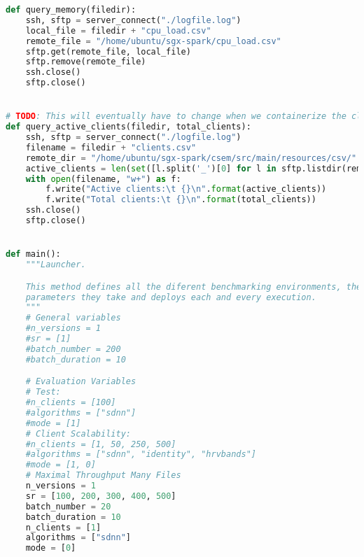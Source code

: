 \begin{lstlisting}[language=Python,caption={Benchmarking and Experiment Deployment Script.},label=code:deployment:experiments]
def query_memory(filedir):
    ssh, sftp = server_connect("./logfile.log")
    local_file = filedir + "cpu_load.csv"
    remote_file = "/home/ubuntu/sgx-spark/cpu_load.csv"
    sftp.get(remote_file, local_file)
    sftp.remove(remote_file)
    ssh.close()
    sftp.close()


# TODO: This will eventually have to change when we containerize the client
def query_active_clients(filedir, total_clients):
    ssh, sftp = server_connect("./logfile.log")
    filename = filedir + "clients.csv"
    remote_dir = "/home/ubuntu/sgx-spark/csem/src/main/resources/csv/"
    active_clients = len(set([l.split('_')[0] for l in sftp.listdir(remote_dir)]))
    with open(filename, "w+") as f:
        f.write("Active clients:\t {}\n".format(active_clients))
        f.write("Total clients:\t {}\n".format(total_clients))
    ssh.close()
    sftp.close()


def main():
    """Launcher.

    This method defines all the diferent benchmarking environments, the
    parameters they take and deploys each and every execution.
    """
    # General variables
    #n_versions = 1
    #sr = [1]
    #batch_number = 200
    #batch_duration = 10

    # Evaluation Variables
    # Test:
    #n_clients = [100]
    #algorithms = ["sdnn"]
    #mode = [1]
    # Client Scalability:
    #n_clients = [1, 50, 250, 500]
    #algorithms = ["sdnn", "identity", "hrvbands"]
    #mode = [1, 0]
    # Maximal Throughput Many Files
    n_versions = 1
    sr = [100, 200, 300, 400, 500]
    batch_number = 20
    batch_duration = 10
    n_clients = [1]
    algorithms = ["sdnn"]
    mode = [0]


\end{lstlisting}
